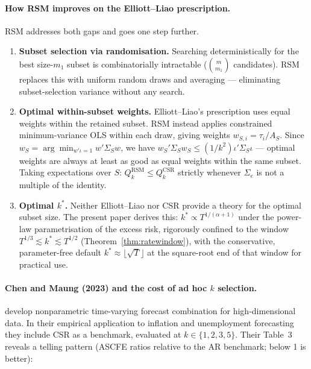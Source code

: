 \documentclass[12pt,a4paper]{article}
\theoremstyle{definition}
\begin{document}
\paragraph{How RSM improves on the Elliott--Liao prescription.}
RSM addresses both gaps and goes one step further.
\begin{enumerate}[nosep,label=(\roman*)]
  \item \textbf{Subset selection via randomisation.}  Searching
    deterministically for the best size-$m_1$ subset is combinatorially
    intractable ($\binom{m}{m_1}$ candidates).  RSM replaces this with
    uniform random draws and averaging --- eliminating subset-selection
    variance without any search.
  \item \textbf{Optimal within-subset weights.}  Elliott--Liao's prescription
    uses equal weights within the retained subset.  RSM instead applies
    constrained minimum-variance OLS within each draw, giving weights
    $w_{S,i}=\tau_i/A_S$.  Since $w_S=\arg\min_{w'\iota=1}w'\Sigma_Sw$, we have
    $w_S'\Sigma_S w_S\le (1/k^2)\iota'\Sigma_S\iota$ --- optimal weights
    are always at least as good as equal weights within the same subset.
    Taking expectations over $S$:
    $Q_k^{\mathrm{RSM}}\le Q_k^{\mathrm{CSR}}$ strictly whenever $\Sigma_e$
    is not a multiple of the identity.
  \item \textbf{Optimal $k^*$.}  Neither Elliott--Liao nor CSR provide a
    theory for the optimal subset size.  The present paper derives this:
    $k^*\propto T^{1/(\alpha+1)}$ under the power-law parametrisation of
    the excess risk, rigorously confined to the window
    $T^{1/3}\lesssim k^*\lesssim T^{1/2}$ (Theorem~\ref{thm:ratewindow}),
    with the conservative, parameter-free default
    $k^*\approx\lfloor\sqrt{T}\rfloor$ at the square-root end of that window
    for practical use.
\end{enumerate}

\paragraph{Chen and Maung (2023) and the cost of ad hoc $k$ selection.}
\citet{ChenMaung2023} develop nonparametric time-varying forecast combination
for high-dimensional data.  In their empirical application to inflation and
unemployment forecasting they include CSR \citep{ElliottGarganoTimmermann2013}
as a benchmark, evaluated at $k\in\{1,2,3,5\}$.  Their Table~3 reveals a
telling pattern (ASCFE ratios relative to the AR benchmark; below 1 is better):
\end{document}
